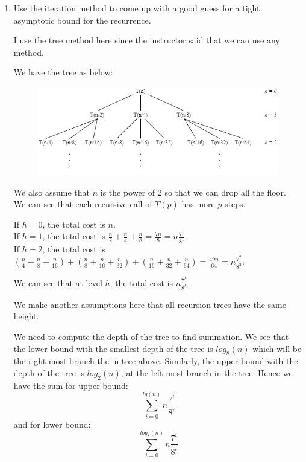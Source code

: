 \documentclass{cpsc413Solutions}
\begin{document}


\begin{problemlist}
\pbitem 
\begin{problem}
\begin{answer}

\begin{enumerate}
    \item Use the iteration method to come up with a good guess for a tight asymptotic bound for the recurrence.
    
    I use the tree method here since the instructor said that we can use any method.
    
    We have the tree as below:
    
    \begin{figure}[htp]
        \centering
        \includegraphics[width=15cm]{ProbSet5_1.png}
    \end{figure}
    
    We also assume that $n$ is the power of 2 so that we can drop all the floor.\\
    We can see that each recursive call of $T(p)$ has more $p$ steps.
    
    If $h=0$, the total cost is $n$.\\
    If $h=1$, the total cost is $\frac{n}{2}+\frac{n}{4}+\frac{n}{8}=\frac{7n}{8}=n\frac{7^1}{8^1}$\\
    If $h=2$, the total cost is $(\frac{n}{4}+\frac{n}{8}+\frac{n}{16})+(\frac{n}{8}+\frac{n}{16}+\frac{n}{32})+(\frac{n}{16}+\frac{n}{32}+\frac{n}{64})=\frac{49n}{64}=n\frac{7^2}{8^2}$.
    
    We can see that at level $h$, the total cost is $n\frac{7^h}{8^h}$.
    
    We make another assumptions here that all recursion trees have the same height.
    
    We need to compute the depth of the tree to find summation. We see that the lower bound with the smallest depth of the tree is $log_8(n)$ which will be the right-most branch the in tree above. Similarly, the upper bound with the depth of the tree is $log_2(n)$, at the left-most branch in the tree. Hence we have the sum for upper bound:
    $$\sum_{i=0}^{lg(n)}n\frac{7^i}{8^i}$$
    and for lower bound:
     $$\sum_{i=0}^{log_8(n)}n\frac{7^i}{8^i}$$
    

\end{enumerate}
\end{answer}
\end{problem}
\end{problemlist}
\end{document}
